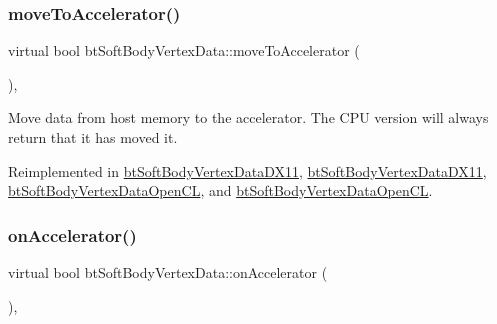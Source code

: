 \mbox{\label{classbtSoftBodyVertexData_a2d3f04a5b2461bf95beca6f3fc48e28b}} 
\subsubsection{\texorpdfstring{move\+To\+Accelerator()}{moveToAccelerator()}\hspace{0.1cm}{\footnotesize\ttfamily [2/2]}}
{\footnotesize\ttfamily virtual bool bt\+Soft\+Body\+Vertex\+Data\+::move\+To\+Accelerator (\begin{DoxyParamCaption}{ }\end{DoxyParamCaption})\hspace{0.3cm}{\ttfamily [inline]}, {\ttfamily [virtual]}}

Move data from host memory to the accelerator. The C\+PU version will always return that it has moved it. 

Reimplemented in \hyperlink{classbtSoftBodyVertexDataDX11_ac12f0c144bc116e3a0e4c11fc0e55365}{bt\+Soft\+Body\+Vertex\+Data\+D\+X11}, \hyperlink{classbtSoftBodyVertexDataDX11_aa68255e1508006f34dedf58855e9db4f}{bt\+Soft\+Body\+Vertex\+Data\+D\+X11}, \hyperlink{classbtSoftBodyVertexDataOpenCL_abd4012054faecf26669f00a04bfd6170}{bt\+Soft\+Body\+Vertex\+Data\+Open\+CL}, and \hyperlink{classbtSoftBodyVertexDataOpenCL_ad30e5afe5e81dbf16af8b10cdcd54044}{bt\+Soft\+Body\+Vertex\+Data\+Open\+CL}.

\mbox{\label{classbtSoftBodyVertexData_a6512d196039f6445489a093ad18f7764}} 
\subsubsection{\texorpdfstring{on\+Accelerator()}{onAccelerator()}\hspace{0.1cm}{\footnotesize\ttfamily [1/2]}}
{\footnotesize\ttfamily virtual bool bt\+Soft\+Body\+Vertex\+Data\+::on\+Accelerator (\begin{DoxyParamCaption}{ }\end{DoxyParamCaption})\hspace{0.3cm}{\ttfamily [inline]}, {\ttfamily [virtual]}}

